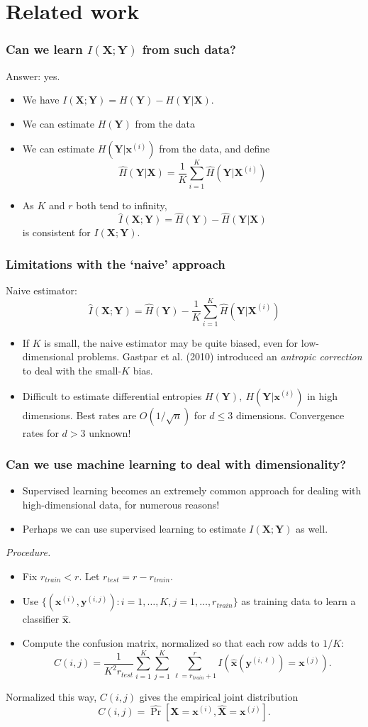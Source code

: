\documentclass{beamer}
\newcommand{\bx}{\boldsymbol{x}}
\newcommand{\by}{\boldsymbol{y}}
\newcommand{\bX}{\boldsymbol{X}}
\newcommand{\bY}{\boldsymbol{Y}}
\begin{document}
\section{Related work}

\begin{frame}
\frametitle{Can we learn $I(\bX; \bY)$ from such data?}
Answer: yes.
\begin{itemize}
\item We have $I(\bX; \bY) = H(\bY) - H(\bY|\bX)$.
\item We can estimate $H(\bY)$ from the data
\item We can estimate $H(\bY| \bx^{(i)})$ from the data, and define
\[
\hat{H}(\bY|\bX) = \frac{1}{K}\sum_{i=1}^K \hat{H}(\bY| \bX^{(i)})
\]
\item As $K$ and $r$ both tend to infinity, 
\[
\hat{I}(\bX; \bY) = \hat{H}(\bY) - \hat{H}(\bY|\bX)
\]
is consistent for $I(\bX; \bY)$.
\end{itemize}
\end{frame}

\begin{frame}
\frametitle{Limitations with the `naive' approach}
Naive estimator:
\[
\hat{I}(\bX; \bY) = \hat{H}(\bY) - \frac{1}{K}\sum_{i=1}^K \hat{H}(\bY| \bX^{(i)})
\]
\begin{itemize}
\item If $K$ is small, the naive estimator may be quite biased, even for low-dimensional problems.
Gastpar et al. (2010) introduced an \emph{antropic correction} to deal with the small-$K$ bias.
\item Difficult to estimate differential entropies $H(\bY),\
  H(\bY|\bx^{(i)})$ in high dimensions.  Best rates are
  $O(1/\sqrt{n})$ for $d \leq 3$ dimensions.  Convergence rates for $d > 3$
  unknown!
\end{itemize}
\end{frame}

\begin{frame}
\frametitle{Can we use machine learning to deal with dimensionality?}
\begin{itemize}
\item Supervised learning becomes an extremely common approach for dealing with high-dimensional data, for numerous reasons!
\item Perhaps we can use supervised learning to estimate $I(\bX; \bY)$ as well.
\end{itemize}
\emph{Procedure.}
\begin{itemize}
\item Fix $r_{train} < r$.  Let $r_{test} = r - r_{train}$.
\item Use $\{(\bx^{(i)}, \by^{(i, j)}): i = 1,\hdots, K, j = 1,\hdots, r_{train}\}$ as training data to learn a classifier $\hat{\bx}$.
\item Compute the confusion matrix, normalized so that each row adds to $1/K$:
\[
C(i, j) = \frac{1}{K^2 r_{test}} \sum_{i=1}^K \sum_{j=1}^K  \sum_{\ell=r_{train} + 1}^r I(\hat{\bx}(\by^{(i,\ell)}) = \bx^{(j)}).
\]
\end{itemize}
Normalized this way, $C(i, j)$ gives the empirical joint distribution
\[
C(i, j) = \hat{\Pr}[\bX = \bx^{(i)}, \hat{\bX} = \bx^{(j)}].
\]
\end{frame}
\end{document}
